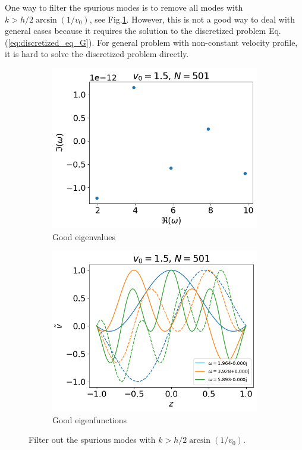 One way to filter the spurious modes is to remove all modes with $k>h/2 \arcsin(1/v_0)$, see Fig.\ref{fig:results_filter_k}. However, this is not a good way to deal with general cases because it requires the solution to the discretized problem Eq.(\ref{eq:discretized_eq_G}). For general problem with non-constant velocity profile, it is hard to solve the discretized problem directly.

\begin{figure}[H]
	\centering
	\begin{subfigure}[b]{0.5\linewidth}
		\includegraphics[width=\linewidth]{img/theoretical_analysis/eigvals_good} 
		\caption{Good eigenvalues}
	\end{subfigure}%
	\begin{subfigure}[b]{0.5\linewidth}
		\includegraphics[width=\linewidth]{img/theoretical_analysis/eigvecs_good} 
		\caption{Good eigenfunctions}
	\end{subfigure}
	\caption{Filter out the spurious modes with $k>h/2\arcsin(1/v_0)$.}
	\label{fig:results_filter_k}
\end{figure}

